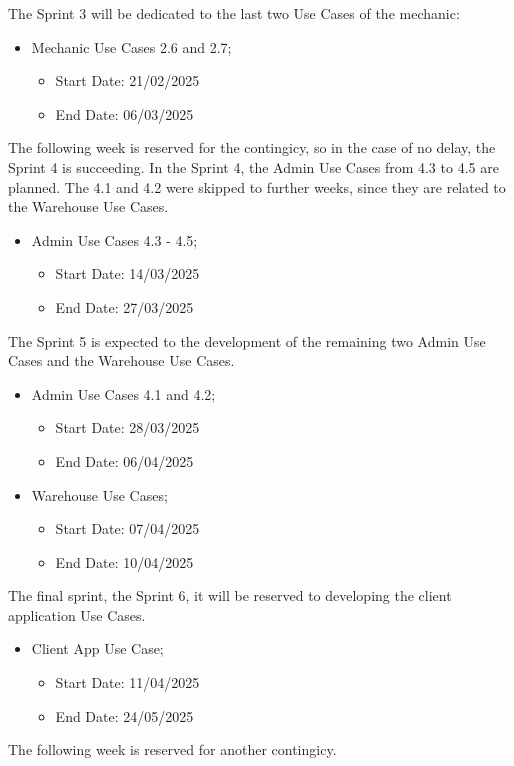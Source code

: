 The Sprint 3 will be dedicated to the last two Use Cases of the mechanic:  

  \begin{itemize}
    \item Mechanic Use Cases 2.6 and 2.7;
    \begin{itemize}
      \item Start Date: 21/02/2025 
      \item End Date: 06/03/2025 
  \end{itemize}
\end{itemize}

The following week is reserved for the contingicy, so in the case of no delay, the Sprint 4 is succeeding.
In the Sprint 4, the Admin Use Cases from 4.3 to 4.5 are planned. The 4.1 and 4.2 were skipped to further weeks, since they are related to the Warehouse Use Cases.

    \begin{itemize}
      \item Admin Use Cases 4.3 - 4.5;
    \begin{itemize}
      \item Start Date: 14/03/2025 
      \item End Date: 27/03/2025 
  \end{itemize}
\end{itemize}

The Sprint 5 is expected to the development of the remaining two Admin Use Cases and the Warehouse Use Cases.

\begin{itemize}
  \item Admin Use Cases 4.1 and 4.2;
  \begin{itemize}
    \item Start Date: 28/03/2025 
    \item End Date: 06/04/2025 
  \end{itemize}
  \item Warehouse Use Cases;
  \begin{itemize}
    \item Start Date: 07/04/2025 
    \item End Date: 10/04/2025 
  \end{itemize}
\end{itemize}

The final sprint, the Sprint 6, it will be reserved to developing the client application Use Cases.

\begin{itemize}
  \item Client App Use Case;
  \begin{itemize}
    \item Start Date: 11/04/2025  
    \item End Date: 24/05/2025 
  \end{itemize} 
\end{itemize}
The following week is reserved for another contingicy.


